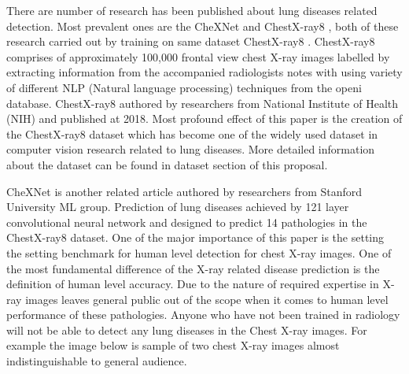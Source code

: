 \documentclass[12pt, twoside, a4paper]{article}
\begin{document}
There are number of research has been published about lung diseases related detection. Most prevalent ones are the CheXNet \cite{CheXNetRP} and ChestX-ray8 \cite{ChestX-ray8}, both of these research carried out by training on same dataset ChestX-ray8 \cite{ChestX-ray8}. ChestX-ray8 comprises of approximately 100,000 frontal view chest X-ray images labelled by extracting information from the accompanied radiologists notes with using variety of different NLP (Natural language processing) techniques from the openi\cite{openi} database. ChestX-ray8 authored by researchers from National Institute of Health (NIH) and published at 2018.
Most profound effect of this paper is the creation of the ChestX-ray8 dataset which has become one of the widely used dataset in computer vision research related to lung diseases. More detailed information about the dataset can be found in dataset section of this proposal. 

CheXNet is another related article authored by researchers from Stanford University ML group. Prediction of lung diseases achieved by 121 layer convolutional neural network and designed to predict 14 pathologies in the ChestX-ray8 dataset. One of the major importance of this paper is the setting the setting benchmark for human level detection for chest X-ray images. One of the most fundamental difference of the X-ray related disease prediction is the definition of human level accuracy. Due to the nature of required expertise in X-ray images leaves general public out of the scope when it comes to human level performance of these pathologies. Anyone who have not been trained in radiology will not be able to detect any lung diseases in the Chest X-ray images. For example the image below is sample of two chest X-ray images almost indistinguishable to general audience.
\end{document}
